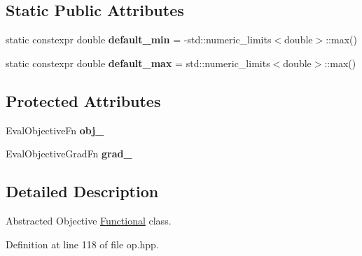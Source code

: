 \subsection*{Static Public Attributes}
\begin{DoxyCompactItemize}
\item 
\hypertarget{classop_1_1Functional_a4cc09198fda82a9f79d48ed443623850}{static constexpr double {\bfseries default\-\_\-min} = -\/std\-::numeric\-\_\-limits$<$double$>$\-::max()}\label{classop_1_1Functional_a4cc09198fda82a9f79d48ed443623850}

\item 
\hypertarget{classop_1_1Functional_a8358852668c0cb77e7b3bf8ae3231965}{static constexpr double {\bfseries default\-\_\-max} = std\-::numeric\-\_\-limits$<$double$>$\-::max()}\label{classop_1_1Functional_a8358852668c0cb77e7b3bf8ae3231965}

\end{DoxyCompactItemize}
\subsection*{Protected Attributes}
\begin{DoxyCompactItemize}
\item 
\hypertarget{classop_1_1Functional_a7fadf361fcccf5c980972dd3fbbaedb1}{Eval\-Objective\-Fn {\bfseries obj\-\_\-}}\label{classop_1_1Functional_a7fadf361fcccf5c980972dd3fbbaedb1}

\item 
\hypertarget{classop_1_1Functional_a1478779b4a681a7033f95e948910aec0}{Eval\-Objective\-Grad\-Fn {\bfseries grad\-\_\-}}\label{classop_1_1Functional_a1478779b4a681a7033f95e948910aec0}

\end{DoxyCompactItemize}


\subsection{Detailed Description}
Abstracted Objective \hyperlink{classop_1_1Functional}{Functional} class. 

Definition at line 118 of file op.\-hpp.



